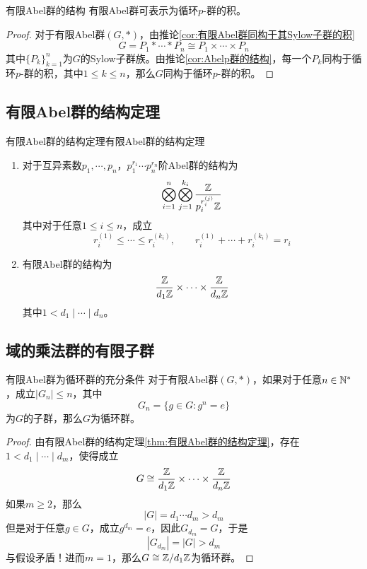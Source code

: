 \begin{corollary}{}{有限Abel群的结构}
	有限Abel群可表示为循环$p$-群的积。
\end{corollary}

\begin{proof}
	对于有限Abel群$(G,*)$，由推论\ref{cor:有限Abel群同构于其Sylow子群的积}
	$$
	G=P_1*\cdots *P_n\cong P_1\times\cdots\times P_n
	$$
	其中$\{ P_k \}_{k=1}^{n}$为$G$的Sylow子群族。由推论\ref{cor:Abelp群的结构}，每一个$P_k$同构于循环$p$-群的积，其中$1\le k\le n$，那么$G$同构于循环$p$-群的积。
\end{proof}

\subsection{有限Abel群的结构定理}

\begin{theorem}{有限Abel群的结构定理}{有限Abel群的结构定理}
	\begin{enumerate}
		\item 对于互异素数$p_1,\cdots,p_n$，$p_1^{r_1}\cdots p_n^{r_n}$阶Abel群的结构为
		$$
		\bigotimes_{i=1}^{n}\bigotimes_{j=1}^{k_i}\frac{\mathbb{Z}}{p_i^{r_i^{(j)}}\mathbb{Z}}
		$$
		其中对于任意$1\le i\le n$，成立
		$$
		r_i^{(1)}\le\cdots \le r_i^{(k_i)},\qquad 
		r_i^{(1)}+\cdots+r_i^{(k_i)}=r_i
		$$
		\item 有限Abel群的结构为
		$$
		\frac{\mathbb{Z}}{d_1\mathbb{Z}}\times\cdots\times\frac{\mathbb{Z}}{d_n\mathbb{Z}}
		$$
		其中$1<d_1\mid \cdots \mid d_n$。
	\end{enumerate}
\end{theorem}

\subsection{域的乘法群的有限子群}

\begin{lemma}{}{有限Abel群为循环群的充分条件}
	对于有限Abel群$(G,*)$，如果对于任意$n\in\mathbb{N}^*$，成立$|G_n|\le n$，其中
	$$
	G_n=\{ g\in G:g^n=e \}
	$$
	为$G$的子群，那么$G$为循环群。
\end{lemma}

\begin{proof}
	由有限Abel群的结构定理\ref{thm:有限Abel群的结构定理}，存在$1<d_1\mid \cdots \mid d_m$，使得成立
	$$
	G\cong \frac{\mathbb{Z}}{d_1\mathbb{Z}}\times\cdots\times\frac{\mathbb{Z}}{d_n\mathbb{Z}}
	$$
	如果$m\ge 2$，那么
	$$
	|G|=d_1\cdots d_m>d_m
	$$
	但是对于任意$g\in G$，成立$g^{d_m}=e$，因此$G_{d_m}=G$，于是
	$$
	|G_{d_m}|=|G|>d_m
	$$
	与假设矛盾！进而$m=1$，那么$G\cong \mathbb{Z}/d_1\mathbb{Z}$为循环群。
\end{proof}

